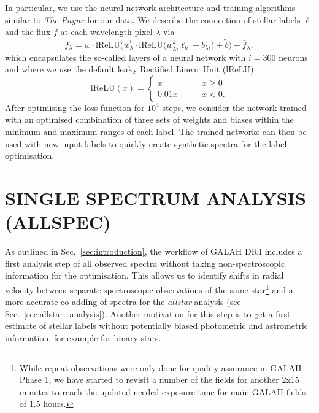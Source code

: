\documentclass[
  journal=pasa,
  manuscript=research-paper, %
  year=2023,
  volume=37
]{cup-journal}
\begin{document}
In particular, we use the neural network architecture and training algorithms similar to \textit{The Payne} \citep{Ting2019} for our data. We describe the connection of stellar labels $\boldsymbol{\ell}$ and the flux $f$ at each wavelength pixel $\lambda$ via
\begin{equation}
f_\lambda = w \cdot \mathrm{lReLU} \bigg( \tilde{w}_\lambda^i \cdot \mathrm{lReLU}  \Big( w^k_{\lambda i} \ell_k + b_{\lambda i} \Big) + \tilde{b} \bigg) + \bar{f}_\lambda,
\label{eq:neural_network_function}
\end{equation}
which encapsulates the so-called layers of a neural network with $i = 300$ neurons and where we use the default leaky Rectified Linear Unit ($\mathrm{lReLU}$)
\begin{equation}
    \mathrm{lReLU} (x) =  \begin{cases}
        x \qquad &x \geq 0 \\
        0.01 x \qquad &x < 0.
    \end{cases}
\end{equation}
After optimising the loss function for $10^4$ steps, we consider the network trained with an optimised combination of three sets of weights and biases within the minimum and maximum ranges of each label. The trained networks can then be used with new input labels to quickly create synthetic spectra for the label optimisation.

\section{SINGLE SPECTRUM ANALYSIS (ALLSPEC)}
\label{sec:allspec_analysis}

As outlined in Sec.~\ref{sec:introduction}, the workflow of GALAH DR4 includes a first analysis step of all observed spectra without taking non-spectroscopic information for the optimisation. This allows us to identify shifts in radial velocity between separate spectroscopic observations of the same star\footnote{While repeat observations were only done for quality assurance in GALAH Phase 1, we have started to revisit a number of the fields for another 2x15 minutes to reach the updated needed exposure time for main GALAH fields of 1.5 hours.} and a more accurate co-adding of spectra for the \textit{allstar} analysis (see Sec.~\ref{sec:allstar_analysis}). Another motivation for this step is to get a first estimate of stellar labels without potentially biased photometric and astrometric information, for example for binary stars.
\end{document}
